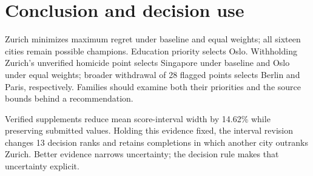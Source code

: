 \section{Conclusion and decision use}
Zurich minimizes maximum regret under baseline and equal weights; all sixteen
cities remain possible champions. Education priority selects Oslo. Withholding
Zurich's unverified homicide point selects Singapore under baseline and Oslo
under equal weights; broader withdrawal of 28 flagged points selects Berlin and
Paris, respectively. Families should examine both their priorities and the
source bounds behind a recommendation.

Verified supplements reduce mean score-interval width by 14.62\% while preserving
submitted values. Holding this evidence fixed, the interval revision changes
13 decision ranks and retains completions in which another city outranks Zurich.
Better evidence narrows uncertainty; the decision rule makes that uncertainty
explicit.
